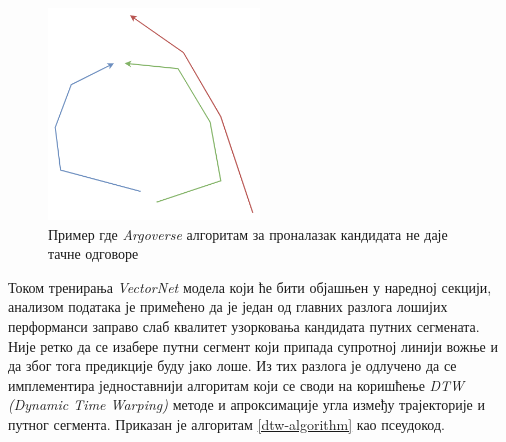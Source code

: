 \documentclass[11pt,oneside]{memoir}
\begin{document}
\begin{figure}[H]
  \centering
  \includegraphics[width=0.5\textwidth]{images/argoverse-clcand-flaws.drawio.png}
  \caption{Пример где \textit{Argoverse} алгоритам за проналазак кандидата не даје тачне одговоре}
  \label{argoverse-clcand-flaws}
\end{figure}

Током тренирања \textit{VectorNet} модела који ће бити објашњен у наредној секцији, анализом података је примећено да је један од главних
разлога лошијих перформанси заправо слаб квалитет узорковања кандидата путних сегмената. Није ретко да се изабере путни сегмент који припада
супротној линији вожње и да због тога предикције буду јако лоше. Из тих разлога је одлучено да се имплементира једноставнији алгоритам
који се своди на коришћење \textit{DTW (Dynamic Time Warping)} методе и апроксимације угла између трајекторије и путног сегмента. Приказан
је алгоритам \ref{dtw-algorithm} као псеудокод.
\end{document}
